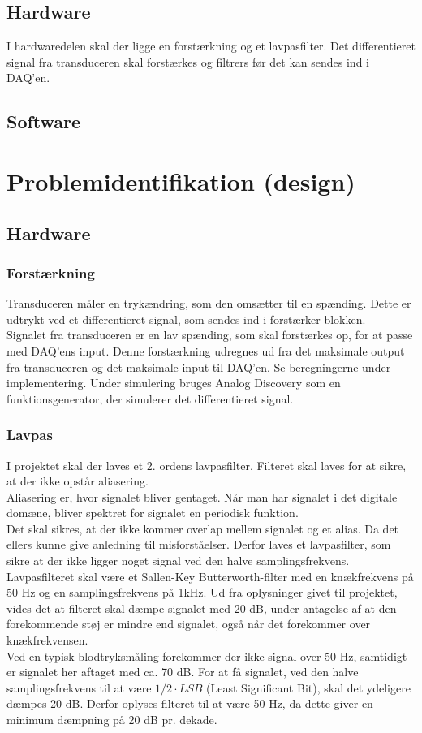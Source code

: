 \subsection{Hardware}
I hardwaredelen skal der ligge en forstærkning og et lavpasfilter. Det differentieret signal fra transduceren skal forstærkes og filtrers før det kan sendes ind i DAQ'en.
\subsection{Software}

\section{Problemidentifikation (design)}
\subsection{Hardware}
\subsubsection{Forstærkning}
Transduceren måler en trykændring, som den omsætter til en spænding. Dette er udtrykt ved et differentieret signal, som sendes ind i forstærker-blokken. \\
Signalet fra transduceren er en lav spænding, som skal forstærkes op, for at passe med DAQ'ens input. Denne forstærkning udregnes ud fra det maksimale output fra transduceren og det maksimale input til DAQ'en. Se beregningerne under implementering.  
\newline
Under simulering bruges Analog Discovery som en funktionsgenerator, der simulerer det differentieret signal.  

\subsubsection{Lavpas}
I projektet skal der laves et 2. ordens lavpasfilter. Filteret skal laves for at sikre, at der ikke opstår aliasering.\\
Aliasering \cite{DSB} er, hvor signalet bliver gentaget. Når man har signalet i det digitale domæne, bliver spektret for signalet en periodisk funktion.\\
Det skal sikres, at der ikke kommer overlap mellem signalet og et alias. Da det ellers kunne give anledning til misforståelser. Derfor laves et lavpasfilter, som sikre at der ikke ligger noget signal ved den halve samplingsfrekvens.\\
Lavpasfilteret skal være et Sallen-Key Butterworth-filter med en knækfrekvens på 50 Hz og en samplingsfrekvens på 1kHz. Ud fra oplysninger givet til projektet, vides det at filteret skal dæmpe signalet med 20 dB, under antagelse af at den forekommende støj er mindre end signalet, også når det forekommer over knækfrekvensen.\\
Ved en typisk blodtryksmåling forekommer der ikke signal over 50 Hz, samtidigt er signalet her aftaget med ca. 70 dB. For at få signalet, ved den halve samplingsfrekvens til at være $ 1/2 \cdot LSB $ (Least Significant Bit), skal det ydeligere dæmpes 20 dB. Derfor oplyses filteret til at være 50 Hz, da dette giver en minimum dæmpning på 20 dB pr. dekade.
